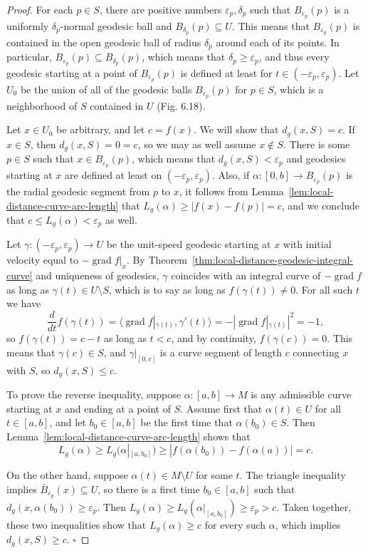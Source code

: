 \begin{proof}
For each $p \in S$, there are positive numbers $\varepsilon_p, \delta_p$ such that $B_{\varepsilon_p}(p)$ is a uniformly $\delta_p$-normal geodesic ball and $B_{\delta_p}(p) \subseteq U$. This means that $B_{\varepsilon_p}(p)$ is contained in the open geodesic ball of radius $\delta_p$ around each of its points. In particular, $B_{\varepsilon_p}(p) \subseteq B_{\delta_p}(p)$, which means that $\delta_p \geq \varepsilon_p$, and thus every geodesic starting at a point of $B_{\varepsilon_p}(p)$ is defined at least for $t \in (-\varepsilon_p, \varepsilon_p)$. Let $U_0$ be the union of all of the geodesic balls $B_{\varepsilon_p}(p)$ for $p \in S$, which is a neighborhood of $S$ contained in $U$ (Fig. 6.18).

Let $x \in U_0$ be arbitrary, and let $c = f(x)$. We will show that $d_g(x, S) = c$. If $x \in S$, then $d_g(x, S) = 0 = c$, so we may as well assume $x \notin S$. There is some $p \in S$ such that $x \in B_{\varepsilon_p}(p)$, which means that $d_g(x, S) < \varepsilon_p$ and geodesics starting at $x$ are defined at least on $(-\varepsilon_p, \varepsilon_p)$. Also, if $\alpha: [0, b] \to B_{\varepsilon_p}(p)$ is the radial geodesic segment from $p$ to $x$, it follows from Lemma~\ref{lem:local-distance-curve-arc-length} that $L_g(\alpha) \geq |f(x) - f(p)| = c$, and we conclude that $c \leq L_g(\alpha) < \varepsilon_p$ as well.

Let $\gamma: (-\varepsilon_p, \varepsilon_p) \to U$ be the unit-speed geodesic starting at $x$ with initial velocity equal to $-\operatorname{grad} f|_x$. By Theorem~\ref{thm:local-distance-geodesic-integral-curve} and uniqueness of geodesics, $\gamma$ coincides with an integral curve of $-\operatorname{grad} f$ as long as $\gamma(t) \in U \setminus S$, which is to say as long as $f(\gamma(t)) \neq 0$. For all such $t$ we have
\[
\frac{d}{dt} f(\gamma(t)) = \langle \operatorname{grad} f|_{\gamma(t)}, \gamma'(t) \rangle = -|\operatorname{grad} f|_{\gamma(t)}|^2 = -1,
\]
so $f(\gamma(t)) = c - t$ as long as $t < c$, and by continuity, $f(\gamma(c)) = 0$. This means that $\gamma(c) \in S$, and $\gamma|_{[0,c]}$ is a curve segment of length $c$ connecting $x$ with $S$, so $d_g(x,S) \le c$.

To prove the reverse inequality, suppose $\alpha : [a,b] \to M$ is any admissible curve starting at $x$ and ending at a point of $S$. Assume first that $\alpha(t) \in U$ for all $t \in [a,b]$, and let $b_0 \in [a,b]$ be the first time that $\alpha(b_0) \in S$. Then Lemma~\ref{lem:local-distance-curve-arc-length} shows that
\[
L_g(\alpha) \ge L_g(\alpha|_{[a,b_0]}) \ge |f(\alpha(b_0)) - f(\alpha(a))| = c.
\]

On the other hand, suppose $\alpha(t) \in M \setminus U$ for some $t$. The triangle inequality implies $\bar{B}_{\varepsilon_p}(x) \subseteq U$, so there is a first time $b_0 \in [a,b]$ such that $d_g(x,\alpha(b_0)) \ge \varepsilon_p$. Then $L_g(\alpha) \ge L_g(\alpha|_{[a,b_0]}) \ge \varepsilon_p > c$. Taken together, these two inequalities show that $L_g(\alpha) \ge c$ for every such $\alpha$, which implies $d_g(x,S) \ge c$. $\square$
\end{proof}

